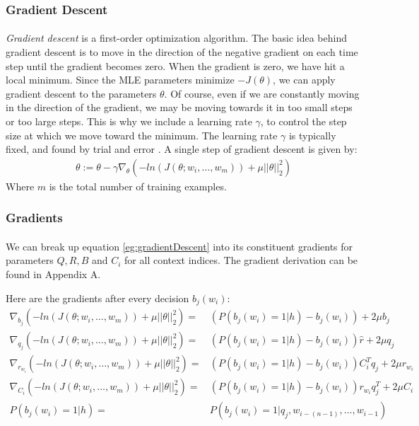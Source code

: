 \subsubsection{Gradient Descent}
\paragraph{}
\emph{Gradient descent} is a first-order optimization algorithm. The basic idea behind gradient descent is to move in the direction of the negative gradient on each time step until the gradient becomes zero. When the gradient is zero, we have hit a local minimum. Since the MLE parameters minimize $-J(\theta)$, we can apply gradient descent to the parameters $\theta$. Of course, even if we are constantly moving in the direction of the gradient, we may be moving towards it in too small steps or too large steps. This is why we include a learning rate $\gamma$, to control the step size at which we move toward the minimum. The learning rate $\gamma$ is typically fixed, and found by trial and error \cite{Elkan2013}.
A single step of gradient descent is given by:
\begin{align}
\theta := \theta - \gamma \nabla_\theta \left( -ln(J(\theta;w_i,\dots, w_m)) +  \mu ||\theta||^2_2 \right) \label{eg:gradientDescent} 
\end{align}
Where $m$ is the total number of training examples.

\subsubsection{Gradients}
\paragraph{}
We can break up equation \ref{eg:gradientDescent} into its constituent gradients for parameters $Q,R,B$ and $C_i$ for all context indices. The gradient derivation can be found in Appendix A.

Here are the gradients after every decision $b_j(w_i)$:
\begin{align}
\nabla_{b_j} \left( -ln(J(\theta;w_i,\dots, w_m)) +  \mu ||\theta||^2_2 \right)  = &  \left( P \left(b_j(w_i) = 1 | h \right) - b_j(w_i) \right) +2\mu b_j  \label{eq:gradients}
\\
\nabla_{q_j} \left( -ln(J(\theta;w_i,\dots, w_m)) +  \mu ||\theta||^2_2 \right)  = &\left( P \left(b_j(w_i) = 1 | h \right) - b_j(w_i) \right)\hat{r} +2\mu q_j \nonumber
\\
\nabla_{r_{w_i}} \left( -ln(J(\theta;w_i,\dots, w_m)) +  \mu ||\theta||^2_2 \right)  = & \left( P \left(b_j(w_i) = 1 | h \right) - b_j(w_i)\right) C_i^T q_j   +2\mu r_{w_i} \nonumber
\\
\nabla_{C_i} \left( -ln(J(\theta;w_i,\dots, w_m)) +  \mu ||\theta||^2_2 \right)  = &\left( P \left(b_j(w_i) = 1 | h \right) - b_j(w_i) \right) r_{w_i}q_j^T  +2\mu C_i \nonumber
\\
P \left(b_j(w_i) = 1 | h \right)= & P \left(b_j(w_i) = 1 | q_j, w_{i-(n-1)},\dots, w_{i-1} \right) \nonumber
\end{align}

